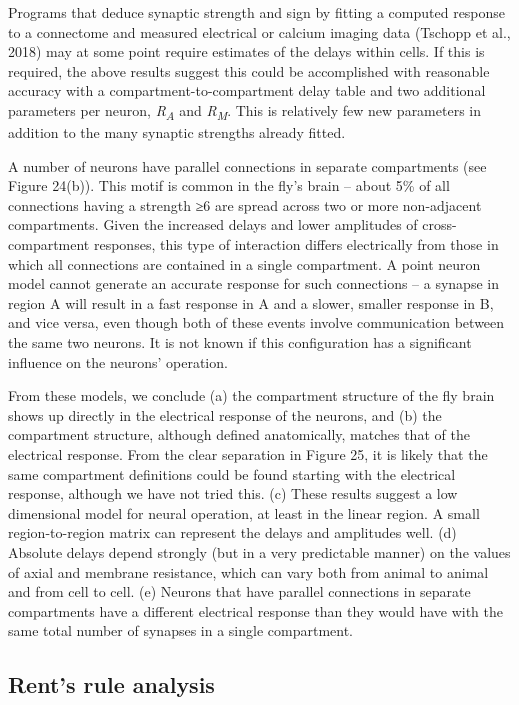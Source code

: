 \documentclass{article}
\begin{document}
Programs that deduce synaptic strength and sign by fitting a computed response to a connectome and measured electrical or calcium imaging data (Tschopp et al., 2018) may at some point require estimates of the delays within cells. If this is required, the above results suggest this could be accomplished with reasonable accuracy with a compartment-to-compartment delay table and two additional parameters per neuron, \emph{R}\emph{\textsubscript{A}} and \emph{R}\emph{\textsubscript{M}}. This is relatively few new parameters in addition to the many synaptic strengths already fitted.

A number of neurons have parallel connections in separate compartments (see Figure 24(b)). This motif is common in the fly’s brain – about 5\% of all connections having a strength ≥6 are spread across two or more non-adjacent compartments. Given the increased delays and lower amplitudes of cross-compartment responses, this type of interaction differs electrically from those in which all connections are contained in a single compartment. A point neuron model cannot generate an accurate response for such connections – a synapse in region A will result in a fast response in A and a slower, smaller response in B, and vice versa, even though both of these events involve communication between the same two neurons. It is not known if this configuration has a significant influence on the neurons’ operation.

From these models, we conclude (a) the compartment structure of the fly brain shows up directly in the electrical response of the neurons, and (b) the compartment structure, although defined anatomically, matches that of the electrical response. From the clear separation in Figure 25, it is likely that the same compartment definitions could be found starting with the electrical response, although we have not tried this. (c) These results suggest a low dimensional model for neural operation, at least in the linear region. A small region-to-region matrix can represent the delays and amplitudes well. (d) Absolute delays depend strongly (but in a very predictable manner) on the values of axial and membrane resistance, which can vary both from animal to animal and from cell to cell. (e) Neurons that have parallel connections in separate compartments have a different electrical response than they would have with the same total number of synapses in a single compartment.

\subsection*{Rent’s rule analysis}
\end{document}
